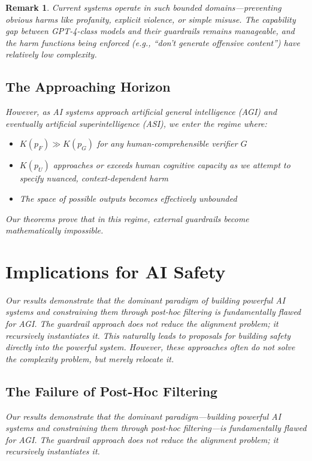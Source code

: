 \documentclass[11pt]{article}
\newtheorem{remark}{Remark}
\begin{document}
\begin{remark}
Current systems operate in such bounded domains—preventing obvious harms like profanity, explicit violence, or simple misuse. The capability gap between GPT-4-class models and their guardrails remains manageable, and the harm functions being enforced (e.g., ``don't generate offensive content'') have relatively low complexity.

\subsection{The Approaching Horizon}

However, as AI systems approach artificial general intelligence (AGI) and eventually artificial superintelligence (ASI), we enter the regime where:
\begin{itemize}
\item $K(p_F) \gg K(p_G)$ for any human-comprehensible verifier $G$
\item $K(p_U)$ approaches or exceeds human cognitive capacity as we attempt to specify nuanced, context-dependent harm
\item The space of possible outputs becomes effectively unbounded
\end{itemize}

Our theorems prove that in this regime, external guardrails become mathematically impossible.

\section{Implications for AI Safety}

Our results demonstrate that the dominant paradigm of building powerful AI systems and constraining them through post-hoc filtering is fundamentally flawed for AGI. The guardrail approach does not reduce the alignment problem; it recursively instantiates it. This naturally leads to proposals for building safety directly into the powerful system. However, these approaches often do not solve the complexity problem, but merely relocate it.

\subsection{The Failure of Post-Hoc Filtering}
Our results demonstrate that the dominant paradigm—building powerful AI systems and constraining them through post-hoc filtering—is fundamentally flawed for AGI. The guardrail approach does not reduce the alignment problem; it recursively instantiates it.


\end{remark}
\end{document}
